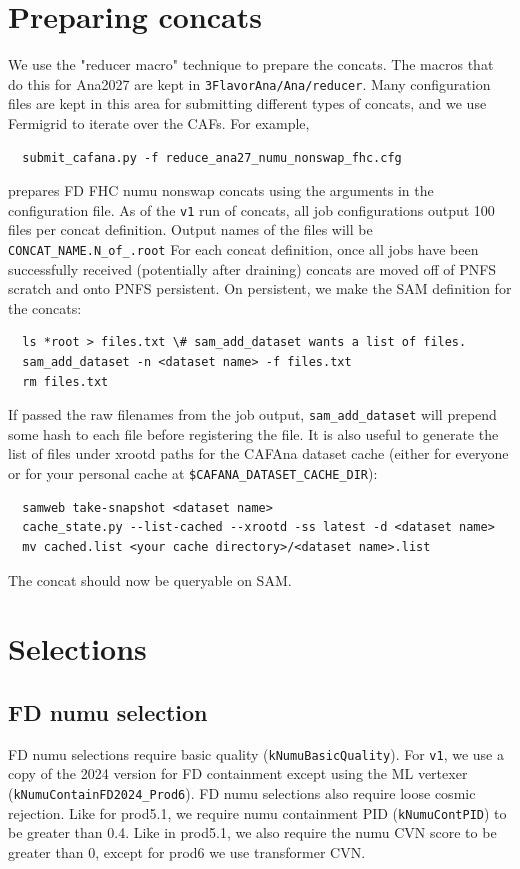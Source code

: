 \documentclass{article}
\begin{document}
\section{Preparing concats}
We use the "reducer macro" technique to prepare the concats. The macros that do this for Ana2027 are kept in \texttt{3Flavor\-Ana/\-Ana/\-reducer}. Many configuration files are kept in this area for submitting different types of concats, and we use Fermigrid to iterate over the CAFs. For example,
\begin{verbatim}
  submit_cafana.py -f reduce_ana27_numu_nonswap_fhc.cfg
\end{verbatim}
prepares FD FHC numu nonswap concats using the arguments in the configuration file. As of the \texttt{v1} run of concats, all job configurations output 100 files per concat definition. Output names of the files will be \texttt{CONCAT\_\-NAME.N\_\-of\_.\-root} For each concat definition, once all jobs have been successfully received (potentially after draining) concats are moved off of PNFS scratch and onto PNFS persistent. On persistent, we make the SAM definition for the concats:
\begin{verbatim}
  ls *root > files.txt \# sam_add_dataset wants a list of files.
  sam_add_dataset -n <dataset name> -f files.txt
  rm files.txt
\end{verbatim}
If passed the raw filenames from the job output, \texttt{sam\_\-add\_\-dataset} will prepend some hash to each file before registering the file. It is also useful to generate the list of files under xrootd paths for the CAFAna dataset cache (either for everyone or for your personal cache at \texttt{\$CAFANA\_\-DATASET\_\-CACHE\_\-DIR}):
\begin{verbatim}
  samweb take-snapshot <dataset name>
  cache_state.py --list-cached --xrootd -ss latest -d <dataset name>
  mv cached.list <your cache directory>/<dataset name>.list
\end{verbatim}
The concat should now be queryable on SAM.

\section{Selections}
\subsection{FD numu selection}
FD numu selections require basic quality (\texttt{k\-Numu\-Basic\-Quality}). For \texttt{v1}, we use a copy of the 2024 version for FD containment except using the ML vertexer (\texttt{k\-Numu\-Contain\-FD2024\_\-Prod6}).
FD numu selections also require loose cosmic rejection. Like for prod5.1, we require numu containment PID (\texttt{k\-Numu\-Cont\-PID}) to be greater than 0.4. Like in prod5.1, we also require the numu CVN score to be greater than 0, except for prod6 we use transformer CVN.
\end{document}
